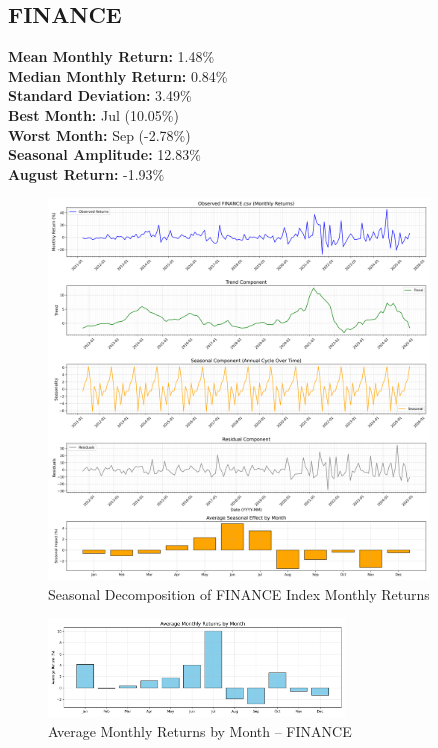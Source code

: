\documentclass[12pt]{article}
\begin{document}
\clearpage

\subsection{FINANCE}
\textbf{Mean Monthly Return:} 1.48\% \\
\textbf{Median Monthly Return:} 0.84\% \\
\textbf{Standard Deviation:} 3.49\% \\
\textbf{Best Month:} Jul (10.05\%) \\
\textbf{Worst Month:} Sep (-2.78\%) \\
\textbf{Seasonal Amplitude:} 12.83\% \\
\textbf{August Return:} -1.93\% \\

\begin{figure}[h!]
    \centering
    \includegraphics[width=0.9\textwidth]{decomposition_outputs/FINANCE_seasonal_decomposition.png}
    \caption{Seasonal Decomposition of FINANCE Index Monthly Returns}
\end{figure}

\begin{figure}[h!]
    \centering
    \includegraphics[width=0.7\textwidth]{decomposition_outputs/FINANCE_avg_monthly_returns.png}
    \caption{Average Monthly Returns by Month -- FINANCE}
\end{figure}
\end{document}
